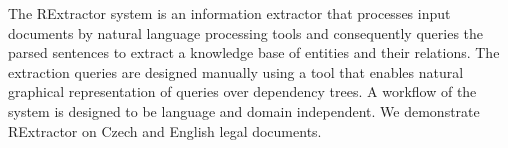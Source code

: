 The RExtractor system is an information extractor that processes input documents by natural language processing tools and consequently queries the parsed sentences to extract a knowledge base of entities and their relations. The extraction queries are designed manually using a tool that enables natural graphical representation of queries over dependency trees. A workflow of the system is designed to be language and domain independent. We demonstrate RExtractor on Czech and English legal documents.
